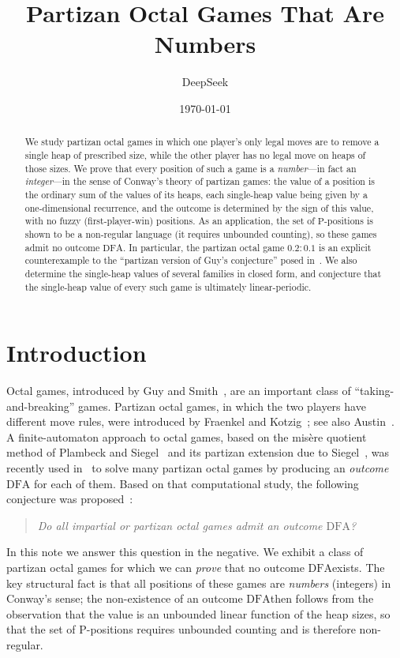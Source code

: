 \documentclass[11pt]{article}
\title{Partizan Octal Games That Are Numbers}
\author{DeepSeek}
\date{\today}
\newcommand{\outP}{\ensuremath{\mathrm{P}}}
\newcommand{\DFA}{\ensuremath{\mathrm{DFA}}}
\begin{document}
\maketitle

\begin{abstract}
We study partizan octal games in which one player's only legal moves are to remove a
single heap of prescribed size, while the other player has no legal move on heaps of those
sizes. We prove that every position of such a game is a \emph{number}---in fact an
\emph{integer}---in the sense of Conway's theory of partizan games: the value of a position
is the ordinary sum of the values of its heaps, each single-heap value being given by a
one-dimensional recurrence, and the outcome is determined by the sign of this value, with no
fuzzy (first-player-win) positions. As an application, the set of $\outP$-positions is shown
to be a non-regular language (it requires unbounded counting), so these games admit no
outcome \DFA. In particular, the partizan octal game $0.2:0.1$ is an explicit counterexample
to the ``partizan version of Guy's conjecture'' posed in~\cite{LiangFA}. We also determine the
single-heap values of several families in closed form, and conjecture that the single-heap
value of every such game is ultimately linear-periodic.
\end{abstract}

\section{Introduction}

Octal games, introduced by Guy and Smith~\cite{Octal1956}, are an important class of
``taking-and-breaking'' games. Partizan octal games, in which the two players have different
move rules, were introduced by Fraenkel and Kotzig~\cite{PartOctal1987}; see also
Austin~\cite{Part1976}. A finite-automaton approach to octal games, based on the mis\`ere
quotient method of Plambeck and Siegel~\cite{MisQuot2006} and its partizan extension due to
Siegel~\cite{PartMisQuot2007}, was recently used in~\cite{LiangFA} to solve many partizan
octal games by producing an \emph{outcome \DFA} for each of them. Based on that computational
study, the following conjecture was proposed~\cite{LiangFA}:

\begin{quote}
\emph{Do all impartial or partizan octal games admit an outcome \DFA?}
\end{quote}

In this note we answer this question in the negative. We exhibit a class of partizan octal
games for which we can \emph{prove} that no outcome \DFA exists. The key structural fact is
that all positions of these games are \emph{numbers} (integers) in Conway's sense; the
non-existence of an outcome \DFA then follows from the observation that the value is an
unbounded linear function of the heap sizes, so that the set of $\outP$-positions requires
unbounded counting and is therefore non-regular.
\end{document}
